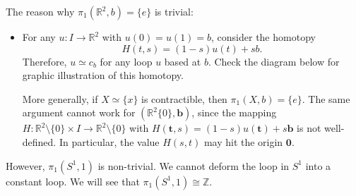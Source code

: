 \begin{example}
The reason why $\pi_1(\mathbb{R}^2,b) = \{e\}$ is trivial:
\begin{itemize}
\item
For any $u:I\to\mathbb{R}^2$ with $u(0)=u(1)=b$, consider the homotopy 
\[
H(t,s) = (1-s)u(t)+sb.
\]
Therefore, $u\simeq c_b$ for any loop $u$ based at $b$.
Check the diagram below for graphic illustration of this homotopy.
\begin{figure}[H]
\end{figure}
More generally, if $X\simeq\{x\}$ is contractible, then $\pi_1(X,b)=\{e\}$.
The same argument cannot work for $(\mathbb{R}^2 \{0\}, \bm b)$, since the mapping 
$H:\mathbb{R}^2\setminus\{0\}\times I\to \mathbb{R}^2\setminus\{0\}$ with $H(\bm t,s) = (1-s)u(\bm t) + s\bm b$ is not well-defined. In particular, the value $H(s,t)$ may hit the origin $\bm0$.
\end{itemize}
However, $\pi_1(S^1,1)$ is non-trivial. 
We cannot deform the loop in $S^1$ into a constant loop.
We will see that $\pi_1(S^1,1) \cong\mathbb{Z}$.
\end{example}




